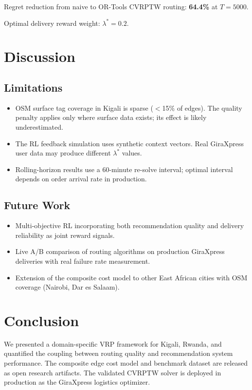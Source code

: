 \documentclass[12pt, a4paper]{article}
\begin{document}
Regret reduction from naive to OR-Tools CVRPTW routing: \textbf{64.4\%}
at $T=5000$.

Optimal delivery reward weight: $\lambda^* = 0.2$.

\section{Discussion}
\label{sec:discussion}

\subsection{Limitations}

\begin{itemize}
  \item OSM surface tag coverage in Kigali is sparse ($<$15\% of edges).
        The quality penalty applies only where surface data exists; its
        effect is likely underestimated.
  \item The RL feedback simulation uses synthetic context vectors. Real
        GiraXpress user data may produce different $\lambda^*$ values.
  \item Rolling-horizon results use a 60-minute re-solve interval; optimal
        interval depends on order arrival rate in production.
\end{itemize}

\subsection{Future Work}

\begin{itemize}
  \item Multi-objective RL incorporating both recommendation quality and
        delivery reliability as joint reward signals.
  \item Live A/B comparison of routing algorithms on production GiraXpress
        deliveries with real failure rate measurement.
  \item Extension of the composite cost model to other East African cities
        with OSM coverage (Nairobi, Dar es Salaam).
\end{itemize}

\section{Conclusion}
\label{sec:conclusion}

We presented a domain-specific VRP framework for Kigali, Rwanda, and
quantified the coupling between routing quality and recommendation system
performance. The composite edge cost model and benchmark dataset are released
as open research artifacts. The validated CVRPTW solver is deployed in
production as the GiraXpress logistics optimizer.



\end{document}
